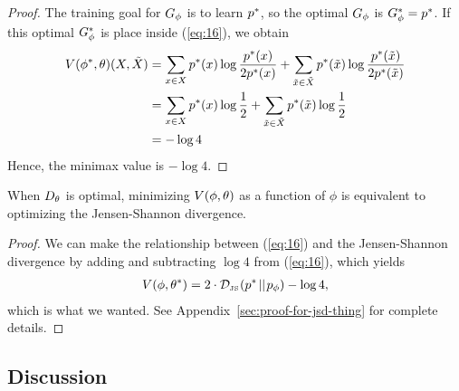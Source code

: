 \begin{proof}
  The training goal for $G_\phi$ is to learn $p^*$, so the optimal $G_\phi$ is $G_\phi^* =
  p^*$. If this optimal $G_\phi^*$ is place inside (\ref{eq:16}), we obtain
  \begin{align}
    \label{eq:side-note}
    V(\phi^*, \theta)(X, \tilde{X}) & = \sum_{x \in X}p^*(x) \log{p^*(x)\over 2 p^*(x)} + \sum_{\tilde{x} \in \tilde{X}}p^*(\tilde{x}) \log{ p^*(\tilde{x}) \over 2 p^*(\tilde{x})} \\
                      & = \sum_{x \in X} p^*(x) \log {1 \over 2} + \sum_{\tilde{x} \in \tilde{X}} p^*(\tilde{x}) \log {1 \over 2} \\
                      & = -\log{4}
  \end{align}
  Hence, the minimax value is $ - \log{4}$.
\end{proof}

\begin{theorem}%
  \label{thm:limiting}
  When $D_\theta$ is optimal, minimizing $V(\phi, \theta)$ as a function of $\phi$ is equivalent to
  optimizing the Jensen-Shannon divergence.
\end{theorem}

\begin{proof}
  We can make the relationship between (\ref{eq:16}) and the
  Jensen-Shannon divergence by adding and subtracting $\log{4}$ from
  (\ref{eq:16}), which yields
  \begin{align}
    \label{eq:desired}
    V(\phi, \theta^*) = 2 \cdot \JSD{\pt}{\pg} - \log{4},
  \end{align}
  which is what we wanted. See Appendix~\ref{sec:proof-for-jsd-thing} for
  complete details.
\end{proof}

\subsection{Discussion}



